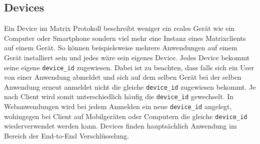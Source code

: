     \subsection{Devices}
    Ein Device im Matrix Protokoll beschreibt weniger ein reales Gerät wie ein Computer oder Smartphone sondern viel mehr eine Instanz eines Matrixclients auf einem Gerät.
    So können beispielsweise mehrere Anwendungen auf einem Gerät installiert sein und jedes wäre sein eigenes Device.
    Jedes Device bekommt seine eigene \texttt{device\_id} zugewiesen.
    Dabei ist zu beachten, dass falls sich ein User von einer Anwendung abmeldet und sich auf dem selben Gerät bei der selben Anwendung erneut anmeldet nicht die gleiche \texttt{device\_id} zugewiesen bekommt.
    Je nach Client wird somit unterschiedlich häufig die \texttt{device\_id} gewechselt.
    In Webanwendungen wird bei jedem Anmelden ein neue \texttt{device\_id} angelegt, wohingegen bei Client auf Mobilgeräten oder Computern die gleiche \texttt{device\_id} wiederverwendet werden kann.
    Devices finden hauptsächlich Anwendung im Bereich der End-to-End Verschlüsselung.

    \newpage
